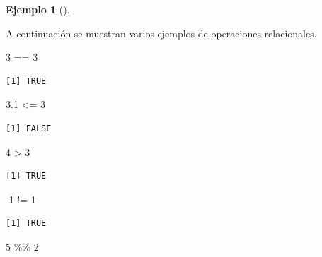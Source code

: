 \documentclass[
  a4paper,
]{scrreport}
\newenvironment{Shaded}{\begin{snugshade}}{\end{snugshade}}
\newcommand{\DecValTok}[1]{\textcolor[rgb]{0.68,0.00,0.00}{#1}}
\newcommand{\FloatTok}[1]{\textcolor[rgb]{0.68,0.00,0.00}{#1}}
\newcommand{\SpecialCharTok}[1]{\textcolor[rgb]{0.37,0.37,0.37}{#1}}
\theoremstyle{definition}
\theoremstyle{definition}
\newtheorem{example}{Ejemplo}[chapter]
\theoremstyle{remark}
\begin{document}
\leavevmode{}%
\begin{example}[]\label{exm-operadores-relacionales}

A continuación se muestran varios ejemplos de operaciones relacionales.

\begin{Shaded}
\begin{Highlighting}[]
\DecValTok{3} \SpecialCharTok{==} \DecValTok{3}
\end{Highlighting}
\end{Shaded}

\begin{verbatim}
[1] TRUE
\end{verbatim}

\begin{Shaded}
\begin{Highlighting}[]
\FloatTok{3.1} \SpecialCharTok{\textless{}=} \DecValTok{3}
\end{Highlighting}
\end{Shaded}

\begin{verbatim}
[1] FALSE
\end{verbatim}

\begin{Shaded}
\begin{Highlighting}[]
\DecValTok{4} \SpecialCharTok{\textgreater{}} \DecValTok{3}
\end{Highlighting}
\end{Shaded}

\begin{verbatim}
[1] TRUE
\end{verbatim}

\begin{Shaded}
\begin{Highlighting}[]
\SpecialCharTok{{-}}\DecValTok{1} \SpecialCharTok{!=} \DecValTok{1}
\end{Highlighting}
\end{Shaded}

\begin{verbatim}
[1] TRUE
\end{verbatim}

\begin{Shaded}
\begin{Highlighting}[]
\DecValTok{5} \SpecialCharTok{\%\%} \DecValTok{2}
\end{Highlighting}
\end{Shaded}


\end{example}
\end{document}
